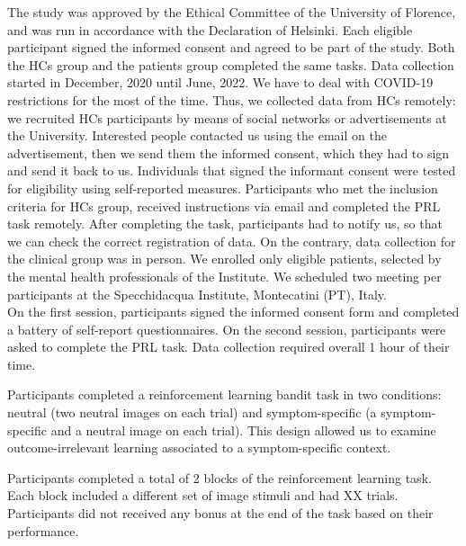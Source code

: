 \documentclass[
  man,floatsintext]{apa6}
\begin{document}
The study was approved by the Ethical Committee of the University of Florence, and was run in accordance with the Declaration of Helsinki.
Each eligible participant signed the informed consent and agreed to be part of the study.
Both the HCs group and the patients group completed the same tasks.
Data collection started in December, 2020 until June, 2022. We have to deal with COVID-19 restrictions for the most of the time. Thus, we collected data from HCs remotely: we recruited HCs participants by means of social networks or advertisements at the University. Interested people contacted us using the email on the advertisement, then we send them the informed consent, which they had to sign and send it back to us. Individuals that signed the informant consent were tested for eligibility using self-reported measures. Participants who met the inclusion criteria for HCs group, received instructions via email and completed the PRL task remotely. After completing the task, participants had to notify us, so that we can check the correct registration of data.
On the contrary, data collection for the clinical group was in person. We enrolled only eligible patients, selected by the mental health professionals of the Institute. We scheduled two meeting per participants at the Specchidacqua Institute, Montecatini (PT), Italy.\\
On the first session, participants signed the informed consent form and completed a battery of self-report questionnaires. On the second session, participants were asked to complete the PRL task. Data collection required overall 1 hour of their time.

Participants completed a reinforcement learning bandit task in two conditions: neutral (two neutral images on each trial) and symptom-specific (a symptom-specific and a neutral image on each trial). This design allowed us to examine outcome-irrelevant learning associated to a symptom-specific context.

Participants completed a total of 2 blocks of the reinforcement learning task. Each block included a different set of image stimuli and had XX trials. Participants did not received any bonus at the end of the task based on their performance.
\end{document}

